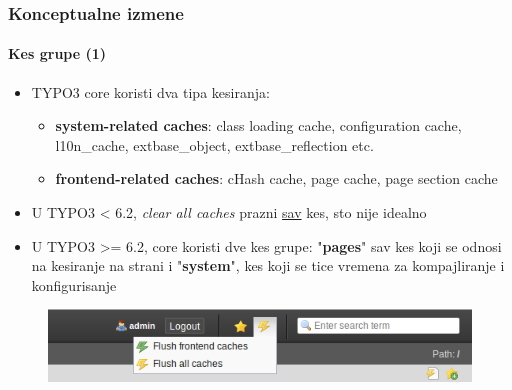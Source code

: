 \begin{frame}[fragile]
	\frametitle{Konceptualne izmene}
	\framesubtitle{Kes grupe (1)}

	\begin{itemize}
		\item TYPO3 core koristi dva tipa kesiranja:

			\begin{itemize}
				\item \textbf{system-related caches}:
				class loading cache, configuration cache, l10n\_cache, extbase\_object, extbase\_reflection etc.
				\item \textbf{frontend-related caches}:
				cHash cache, page cache, page section cache
			\end{itemize}

		\item U TYPO3 < 6.2, \textit{clear all caches} prazni \underline{sav} kes, sto nije idealno

		\item U TYPO3 >= 6.2, core koristi dve kes grupe:\newline
			"\textbf{pages}" sav kes koji se odnosi na kesiranje na strani i "\textbf{system}", kes koji se tice vremena za kompajliranje i konfigurisanje

	\end{itemize}

	\begin{figure}
		\includegraphics[width=0.5\linewidth]{Images/InDepthChanges/CacheGroups.png}
	\end{figure}

\end{frame}


